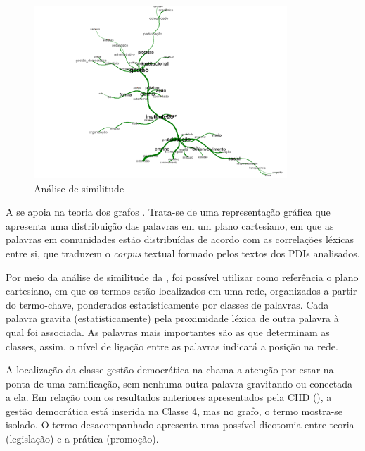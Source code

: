 \documentclass[portuguese]{textolivre}
\begin{document}
\begin{figure}[htbp]
\centering
\includegraphics[width=0.85\textwidth]{fig3.png}
\caption{Análise de similitude}
\label{fig3}
\end{figure}

A  se apoia na teoria dos grafos \cite{holanda_notitle_2017}. Trata-se de uma representação gráfica que apresenta uma distribuição das palavras em um plano cartesiano, em que as palavras em comunidades estão distribuídas de acordo com as correlações léxicas entre si, que traduzem o \textit{corpus} textual formado pelos textos dos PDIs analisados.

Por meio da análise de similitude da , foi possível utilizar como referência o plano cartesiano, em que os termos estão localizados em uma rede, organizados a partir do termo-chave, ponderados estatisticamente por classes de palavras. Cada palavra gravita (estatisticamente) pela proximidade léxica de outra palavra à qual foi associada. As palavras mais importantes são as que determinam as classes, assim, o nível de ligação entre as palavras indicará a posição na rede.

A localização da classe gestão democrática na  chama a atenção por estar na ponta de uma ramificação, sem nenhuma outra palavra gravitando ou conectada a ela. Em relação com os resultados anteriores apresentados pela CHD (), a gestão democrática está inserida na Classe 4, mas no grafo, o termo mostra-se isolado. O termo desacompanhado apresenta uma possível dicotomia entre teoria (legislação) e a prática (promoção).

\end{document}
